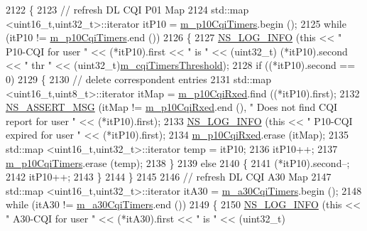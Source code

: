 \begin{DoxyCode}
2122 \{
2123   \textcolor{comment}{// refresh DL CQI P01 Map}
2124   std::map <uint16\_t,uint32\_t>::iterator itP10 = \hyperlink{classns3_1_1PfFfMacScheduler_a5e1e3c699bc1b53b4c11f5bb454f7e1f}{m\_p10CqiTimers}.begin ();
2125   \textcolor{keywordflow}{while} (itP10 != \hyperlink{classns3_1_1PfFfMacScheduler_a5e1e3c699bc1b53b4c11f5bb454f7e1f}{m\_p10CqiTimers}.end ())
2126     \{
2127       \hyperlink{group__logging_gafbd73ee2cf9f26b319f49086d8e860fb}{NS\_LOG\_INFO} (\textcolor{keyword}{this} << \textcolor{stringliteral}{" P10-CQI for user "} << (*itP10).first << \textcolor{stringliteral}{" is "} << (uint32\_t)
      (*itP10).second << \textcolor{stringliteral}{" thr "} << (uint32\_t)\hyperlink{classns3_1_1PfFfMacScheduler_ad2377e8bcc02252e2f0d3ca0fc2895b9}{m\_cqiTimersThreshold});
2128       \textcolor{keywordflow}{if} ((*itP10).second == 0)
2129         \{
2130           \textcolor{comment}{// delete correspondent entries}
2131           std::map <uint16\_t,uint8\_t>::iterator itMap = \hyperlink{classns3_1_1PfFfMacScheduler_a06151884f0dc769c017ceb00b3a8f409}{m\_p10CqiRxed}.find ((*itP10).first);
2132           \hyperlink{assert_8h_aff5ece9066c74e681e74999856f08539}{NS\_ASSERT\_MSG} (itMap != \hyperlink{classns3_1_1PfFfMacScheduler_a06151884f0dc769c017ceb00b3a8f409}{m\_p10CqiRxed}.end (), \textcolor{stringliteral}{" Does not find CQI report
       for user "} << (*itP10).first);
2133           \hyperlink{group__logging_gafbd73ee2cf9f26b319f49086d8e860fb}{NS\_LOG\_INFO} (\textcolor{keyword}{this} << \textcolor{stringliteral}{" P10-CQI expired for user "} << (*itP10).first);
2134           \hyperlink{classns3_1_1PfFfMacScheduler_a06151884f0dc769c017ceb00b3a8f409}{m\_p10CqiRxed}.erase (itMap);
2135           std::map <uint16\_t,uint32\_t>::iterator temp = itP10;
2136           itP10++;
2137           \hyperlink{classns3_1_1PfFfMacScheduler_a5e1e3c699bc1b53b4c11f5bb454f7e1f}{m\_p10CqiTimers}.erase (temp);
2138         \}
2139       \textcolor{keywordflow}{else}
2140         \{
2141           (*itP10).second--;
2142           itP10++;
2143         \}
2144     \}
2145 
2146   \textcolor{comment}{// refresh DL CQI A30 Map}
2147   std::map <uint16\_t,uint32\_t>::iterator itA30 = \hyperlink{classns3_1_1PfFfMacScheduler_abfaea62231103e914d6d66d66a127966}{m\_a30CqiTimers}.begin ();
2148   \textcolor{keywordflow}{while} (itA30 != \hyperlink{classns3_1_1PfFfMacScheduler_abfaea62231103e914d6d66d66a127966}{m\_a30CqiTimers}.end ())
2149     \{
2150       \hyperlink{group__logging_gafbd73ee2cf9f26b319f49086d8e860fb}{NS\_LOG\_INFO} (\textcolor{keyword}{this} << \textcolor{stringliteral}{" A30-CQI for user "} << (*itA30).first << \textcolor{stringliteral}{" is "} << (uint32\_t)

\end{DoxyCode}

